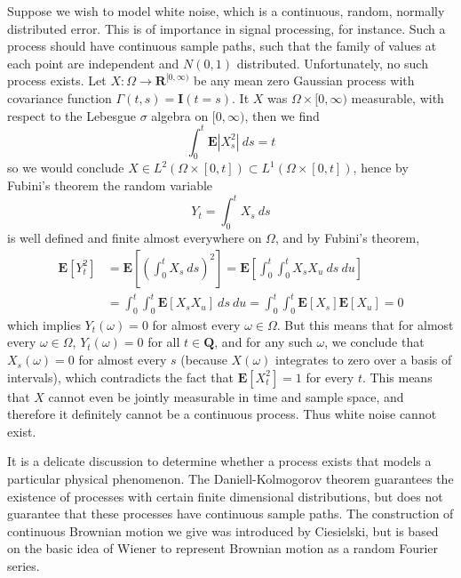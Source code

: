 \begin{example}
    Suppose we wish to model white noise, which is a continuous, random, normally distributed error. This is of importance in signal processing, for instance. Such a process should have continuous sample paths, such that the family of values at each point are independent and $N(0,1)$ distributed. Unfortunately, no such process exists. Let $X: \Omega \to \mathbf{R}^{[0,\infty)}$ be any mean zero Gaussian process with covariance function $\Gamma(t,s) = \mathbf{I}(t = s)$. It $X$ was $\Omega \times [0,\infty)$ measurable, with respect to the Lebesgue $\sigma$ algebra on $[0,\infty)$, then we find
    \[ \int_0^t \mathbf{E}|X_s^2|\ ds = t \]
    so we would conclude $X \in L^2(\Omega \times [0,t]) \subset L^1(\Omega \times [0,t])$, hence by Fubini's theorem the random variable
    \[ Y_t = \int_0^t X_s\ ds \]
    is well defined and finite almost everywhere on $\Omega$, and by Fubini's theorem,
    \begin{align*}
        \mathbf{E}[Y_t^2] &= \mathbf{E} \left[ \left( \int_0^t X_s\ ds \right)^2 \right] = \mathbf{E} \left[ \int_0^t \int_0^t X_sX_u\ ds\ du \right]\\
        &= \int_0^t \int_0^t \mathbf{E}[X_sX_u]\ ds\ du = \int_0^t \int_0^t \mathbf{E}[X_s]\mathbf{E}[X_u] = 0
    \end{align*}
    which implies $Y_t(\omega) = 0$ for almost every $\omega \in \Omega$. But this means that for almost every $\omega \in \Omega$, $Y_t(\omega) = 0$ for all $t \in \mathbf{Q}$, and for any such $\omega$, we conclude that $X_s(\omega) = 0$ for almost every $s$ (because $X(\omega)$ integrates to zero over a basis of intervals), which contradicts the fact that $\mathbf{E}[X_t^2] = 1$ for every $t$. This means that $X$ cannot even be jointly measurable in time and sample space, and therefore it definitely cannot be a continuous process. Thus white noise cannot exist.
\end{example}

It is a delicate discussion to determine whether a process exists that models a particular physical phenomenon. The Daniell-Kolmogorov theorem guarantees the existence of processes with certain finite dimensional distributions, but does not guarantee that these processes have continuous sample paths. The construction of continuous Brownian motion we give was introduced by Ciesielski, but is based on the basic idea of Wiener to represent Brownian motion as a random Fourier series.

